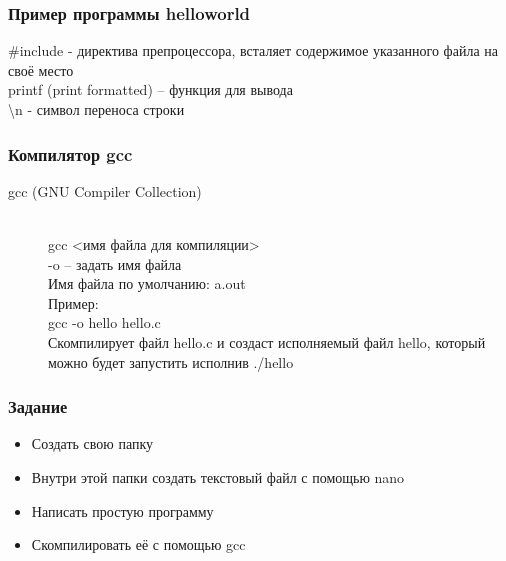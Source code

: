 \documentclass[12pt,pdf,hyperref={unicode}]{beamer}
\begin{document}
\begin{frame}
\frametitle{Пример программы helloworld}



\#include - директива препроцессора, всталяет содержимое указанного файла на своё место \\
printf (print formatted) -- функция для вывода \\
\textbackslash n - символ переноса строки

\end{frame}




\begin{frame}
\frametitle{Компилятор gcc}
\begin{description}
  \item[gcc (GNU Compiler Collection)] \hfill \\
  gcc <имя файла для компиляции>\\
  -o -- задать имя файла \\
  Имя файла по умолчанию: a.out \\
  Пример: \\
  \quad  gcc -o hello hello.c \\
  Скомпилирует файл hello.c и создаст исполняемый файл hello, который можно будет запустить исполнив ./hello
\end{description}
\end{frame}


\begin{frame}
\frametitle{Задание} 
\begin{center}
\begin{itemize}
\item Создать свою папку \\
\item Внутри этой папки создать текстовый файл с помощью nano\\
\item Написать простую программу \\
\item Скомпилировать её с помощью gcc
\end{itemize}
\end{center}
\end{frame}
\end{document}
